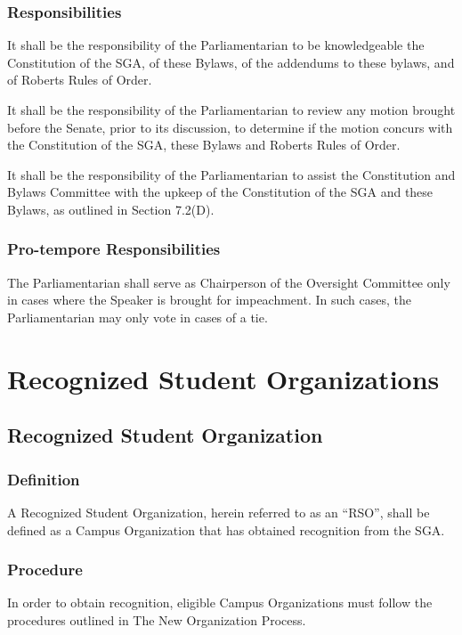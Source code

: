 \documentclass[12pt]{scrreprt}
\begin{document}
\subsection{Responsibilities}
It shall be the responsibility of the Parliamentarian to be knowledgeable the 
Constitution of the SGA, of these Bylaws, of the addendums to these bylaws, and of Roberts Rules of Order. 

It shall be the responsibility of the Parliamentarian to review any motion 
brought before the Senate, prior to its discussion, to determine if the motion 
concurs with the Constitution of the SGA, these Bylaws and Roberts Rules of 
Order. 

It shall be the responsibility of the Parliamentarian to assist the Constitution and Bylaws Committee with the upkeep of the Constitution of the SGA and these Bylaws, as outlined in Section 7.2(D).

\subsection{Pro-tempore Responsibilities}
The Parliamentarian shall serve as Chairperson of the Oversight Committee only 
in cases where the Speaker is brought for impeachment. In such cases, the 
Parliamentarian may only vote in cases of a tie. 

\chapter{Recognized Student Organizations} \label{sec:rsos}

\section{Recognized Student Organization}

\subsection{Definition}
A Recognized Student Organization, herein referred to as an ``RSO'', shall be 
defined as a Campus Organization that has obtained recognition from the SGA.

\subsection{Procedure}
In order to obtain recognition, eligible Campus Organizations must follow the procedures outlined in The New Organization Process.
\end{document}

